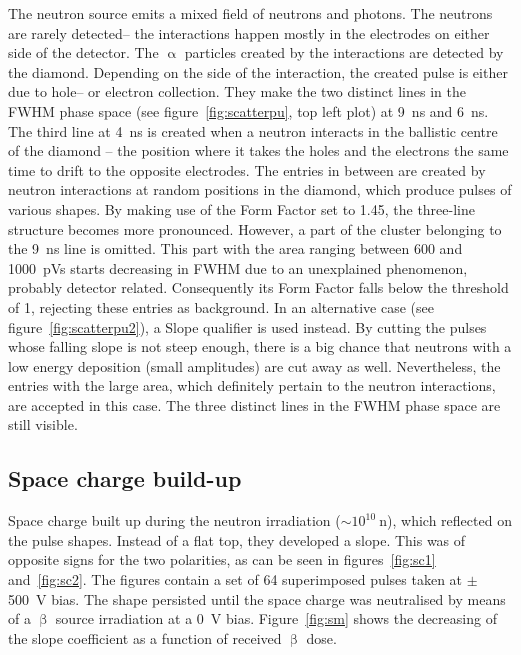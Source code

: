 \documentclass[12pt]{packages/mytustyle}  %
\begin{document}
The neutron source emits a mixed field of neutrons and photons. The neutrons are rarely detected-- the interactions happen mostly in the electrodes on either side of the detector. The $\upalpha$ particles created by the interactions are detected by the diamond. Depending on the side of the interaction, the created pulse is either due to hole-- or electron collection. They make the two distinct lines in the FWHM phase space (see figure~\ref{fig:scatterpu}, top left plot) at 9~ns and 6~ns. The third line at 4~ns is created when a neutron interacts in the ballistic centre~\cite{} of the diamond -- the position where it takes the holes and the electrons the same time to drift to the opposite electrodes. The entries in between are created by neutron interactions at random positions in the diamond, which produce pulses of various shapes. By making use of the Form Factor set to 1.45, the three-line structure becomes more pronounced. However, a part of the cluster belonging to the 9~ns line is omitted. This part with the area ranging between 600 and 1000~pVs starts decreasing in FWHM due to an unexplained phenomenon, probably detector related. Consequently its Form Factor falls below the threshold of 1, rejecting these entries as background. In an alternative case (see figure~\ref{fig:scatterpu2}), a Slope qualifier is used instead. By cutting the pulses whose falling slope is not steep enough, there is a big chance that neutrons with a low energy deposition (small amplitudes) are cut away as well. Nevertheless, the entries with the large area, which definitely pertain to the neutron interactions, are accepted in this case. The three distinct lines in the FWHM phase space are still visible.



\subsection{Space charge build-up}
\label{sec:spacecharge}
Space charge built up during the neutron irradiation ($\sim10^{10}~$n), which reflected on the pulse shapes. Instead of a flat top, they developed a slope. This was of opposite signs for the two polarities, as can be seen in figures~\ref{fig:sc1} and~\ref{fig:sc2}. The figures contain a set of 64 superimposed pulses taken at $\pm$500~V bias. The shape persisted until the space charge was neutralised by means of a $\upbeta$ source irradiation at a 0~V bias. Figure~\ref{fig:sm} shows the decreasing of the slope coefficient as a function of received $\upbeta$ dose.
\end{document}
